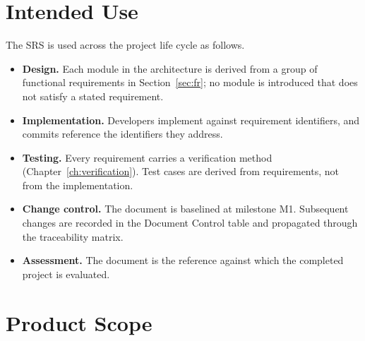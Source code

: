 \documentclass[11pt,a4paper]{report}
\begin{document}
\section{Intended Use}
The SRS is used across the project life cycle as follows.
\begin{itemize}
  \item \textbf{Design.} Each module in the architecture is derived from a group of
        functional requirements in Section~\ref{sec:fr}; no module is introduced that does
        not satisfy a stated requirement.
  \item \textbf{Implementation.} Developers implement against requirement identifiers, and
        commits reference the identifiers they address.
  \item \textbf{Testing.} Every requirement carries a verification method
        (Chapter~\ref{ch:verification}). Test cases are derived from requirements, not from
        the implementation.
  \item \textbf{Change control.} The document is baselined at milestone M1. Subsequent
        changes are recorded in the Document Control table and propagated through the
        traceability matrix.
  \item \textbf{Assessment.} The document is the reference against which the completed
        project is evaluated.
\end{itemize}

\section{Product Scope}
\end{document}
